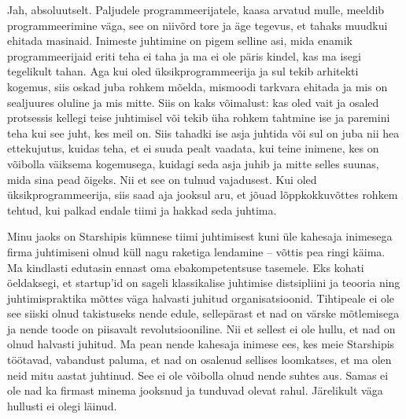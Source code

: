 
Jah, absoluutselt. Paljudele programmeerijatele, 
kaasa arvatud mulle, meeldib programmeerimine väga, see on niivõrd 
tore ja äge tegevus, et tahaks  
muudkui ehitada masinaid. Inimeste juhtimine on pigem selline asi, mida 
enamik programmeerijaid eriti teha ei taha ja ma ei ole päris kindel, kas ma 
isegi tegelikult tahan. Aga kui 
oled üksikprogrammeerija ja sul tekib arhitekti kogemus, siis 
oskad juba rohkem mõelda, mismoodi tarkvara ehitada ja mis 
on sealjuures oluline ja mis mitte. Siis on kaks võimalust: 
kas oled vait ja osaled protsessis kellegi teise juhtimisel või tekib üha 
rohkem tahtmine ise ja paremini 
teha kui see juht, kes meil on. Siis tahadki ise asja juhtida või sul on juba 
nii 
hea ettekujutus, kuidas teha, et ei suuda pealt vaadata, kui 
teine inimene, kes on võibolla väiksema kogemusega,  
kuidagi seda asja juhib ja mitte selles suunas, mida sina pead õigeks. Nii et 
see on tulnud vajadusest. Kui 
oled üksikprogrammeerija, siis saad aja jooksul aru, et jõuad
lõppkokkuvõttes rohkem tehtud, kui palkad 
endale tiimi ja hakkad seda juhtima. 

Minu jaoks on Starshipis kümnese 
tiimi juhtimisest kuni üle kahesaja inimesega firma juhtimiseni olnud küll nagu 
raketiga lendamine -- võttis pea ringi käima. Ma kindlasti 
edutasin ennast oma ebakompetentsuse tasemele. Eks kohati öeldaksegi, et 
startup'id on sageli klassikalise juhtimise 
distsipliini ja teooria ning juhtimispraktika mõttes väga halvasti juhitud 
organisatsioonid. Tihtipeale ei ole see siiski olnud takistuseks nende edule, 
sellepärast et nad on värske mõtlemisega ja nende toode on 
piisavalt revolutsiooniline. Nii et sellest ei ole 
hullu, et nad on olnud halvasti juhitud. Ma pean nende kahesaja 
inimese ees, kes meie Starshipis töötavad, vabandust paluma, et nad on osalenud 
sellises loomkatses, 
et ma olen neid mitu aastat juhtinud. See ei ole võibolla olnud nende 
suhtes aus. Samas ei ole nad ka firmast minema jooksnud 
ja tunduvad olevat rahul. Järelikult väga hullusti ei olegi läinud.
